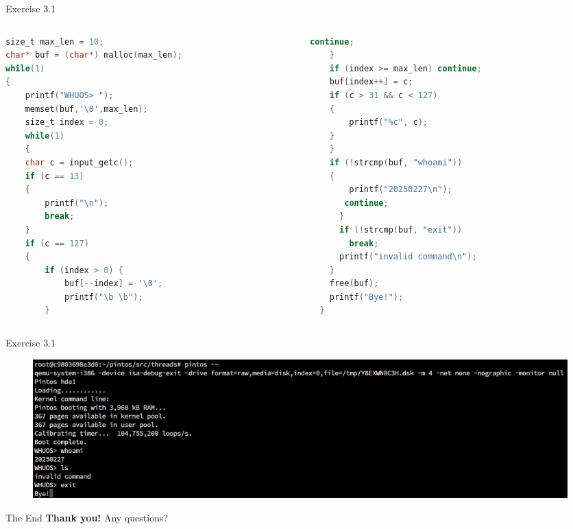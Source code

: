 \documentclass[14pt]{beamer}
\begin{document}
\begin{frame}[fragile]{Exercise 3.1}
\begin{columns}
\begin{column}{0.5\textwidth}
\begin{block}{}
\begin{lstlisting}[language=C]
size_t max_len = 10;
char* buf = (char*) malloc(max_len);
while(1)
{
    printf("WHUOS> ");
    memset(buf,'\0',max_len);
    size_t index = 0;
    while(1)
    {
    char c = input_getc();
    if (c == 13)
    {
        printf("\n");
        break;
    }
    if (c == 127)
    {
        if (index > 0) {
            buf[--index] = '\0';
            printf("\b \b");
        }
\end{lstlisting}
\end{block}
\end{column}
\begin{column}{0.5\textwidth}
\begin{block}{}
\begin{lstlisting}[language=C]
        continue;
    }
    if (index >= max_len) continue;
    buf[index++] = c;
    if (c > 31 && c < 127)
    {
        printf("%c", c);
    }
    }
    if (!strcmp(buf, "whoami"))
    {
        printf("20250227\n");
       continue; 
      }
      if (!strcmp(buf, "exit"))
        break;
      printf("invalid command\n");
    }
    free(buf);
    printf("Bye!");
  }
\end{lstlisting}
\end{block}
\end{column}
\end{columns}
\end{frame}
\begin{frame}{Exercise 3.1}
    \begin{figure}
        \centering
        \includegraphics[width=\linewidth]{figure/shell.png}
    \end{figure}
\end{frame}
\begin{frame}{The End}
    \centering
    \vfill
    \Huge
    \textbf{Thank you!}
    \vfill
    \normalsize
    Any questions?
    \vfill
\end{frame}
\end{document}

